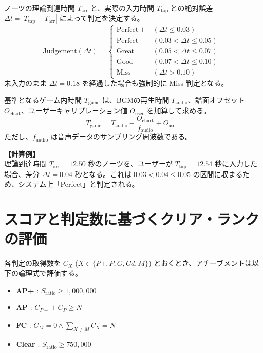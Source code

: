 \documentclass[a4paper,11pt]{ltjsarticle}
\begin{document}
ノーツの理論到達時間 $T_{\mathrm{arr}}$ と、実際の入力時間 $T_{\mathrm{tap}}$ との絶対誤差 $\Delta t = |T_{\mathrm{tap}} - T_{\mathrm{arr}}|$ によって判定を決定する。
\begin{equation}
\mathrm{Judgement}(\Delta t) = 
\begin{cases} 
\mathrm{Perfect+} & (\Delta t \le 0.03) \\
\mathrm{Perfect} & (0.03 < \Delta t \le 0.05) \\
\mathrm{Great} & (0.05 < \Delta t \le 0.07) \\
\mathrm{Good} & (0.07 < \Delta t \le 0.10) \\
\mathrm{Miss} & (\Delta t > 0.10)
\end{cases}
\end{equation}
未入力のまま $\Delta t = 0.18$ を経過した場合も強制的に Miss 判定となる。

基準となるゲーム内時間 $T_{\mathrm{game}}$ は、BGMの再生時間 $T_{\mathrm{audio}}$、譜面オフセット $O_{\mathrm{chart}}$、ユーザーキャリブレーション値 $O_{\mathrm{user}}$ を加算して求める。
\begin{equation}
    T_{\mathrm{game}} = T_{\mathrm{audio}} - \frac{O_{\mathrm{chart}}}{f_{\mathrm{audio}}} + O_{\mathrm{user}}
\end{equation}
ただし、$f_{\mathrm{audio}}$ は音声データのサンプリング周波数である。

\textbf{【計算例】} \\
理論到達時間 $T_{\mathrm{arr}} = 12.50$ 秒のノーツを、ユーザーが $T_{\mathrm{tap}} = 12.54$ 秒に入力した場合、差分 $\Delta t = 0.04$ 秒となる。これは $0.03 < 0.04 \le 0.05$ の区間に収まるため、システム上「Perfect」と判定される。

\section{スコアと判定数に基づくクリア・ランクの評価}

各判定の取得数を $C_X$ ($X \in \{P+, P, G, Gd, M\}$) とおくとき、アチーブメントは以下の論理式で評価する。
\begin{itemize}
    \item \textbf{AP+} : $S_{\mathrm{ratio}} \ge 1,000,000$
    \item \textbf{AP} : $C_{P+} + C_{P} \ge N$
    \item \textbf{FC} : $C_{M} = 0 \land \sum_{X \neq M} C_X = N$
    \item \textbf{Clear} : $S_{\mathrm{ratio}} \ge 750,000$
\end{itemize}
\end{document}
